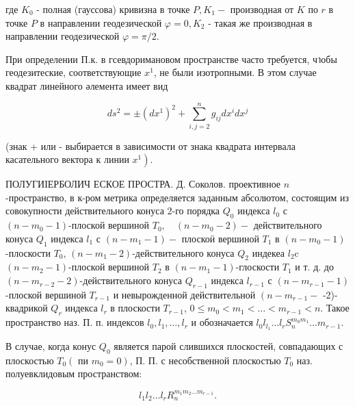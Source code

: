 \documentclass[10pt]{article}
\begin{document}
где $K_{0}$ - полная (гауссова) кривизна в точке $P, K_{1}-$ производная от $K$ по $r$ в точке $P$ в направлении геодезической $\varphi=0, K_{2}$ - такая же производная в направлении геодезической $\varphi=\pi / 2$.



При определении П.к. в гсевдоримановом пространстве часто требуется, чาобы геодезитеские, соответствующие $x^{1}$, не были изотропными. В этом случае квадрат линейного әлемента имеет вид



\[

d s^{2}= \pm\left(d x^{1}\right)^{2}+\sum_{i, j=2}^{n} g_{i j} d x^{i} d x^{j}

\]



(знак + или - выбирается в зависимости от знака квадрата интервала касательного вектора к линии $\left.x^{1}\right)$.



ПОЛУГИІЕРБОЛИЧ ЕСКОЕ ПРОСТРА. Д. Соколов. проективное $n$-пространство, в к-ром метрика определяется заданным абсолютом, состоящим из совокупности действительного конуса 2-го порядка $Q_{0}$ индекса $l_{0}$ с $\left(n-m_{0}-1\right)$-плоской вершиной $T_{0}, \quad\left(n-m_{0}-2\right)-$ действительного конуса $Q_{1}$ индекса $l_{1}$ с $\left(n-m_{1}-1\right)-$ плоскоӥ вершиной $T_{1}$ в $\left(n-m_{0}-1\right)$-плоскости $T_{0}$, $\left(n-m_{1}-2\right)$-действительного конуса $Q_{2}$ индекеа $l_{2} \mathrm{c}$ $\left(n-m_{2}-1\right)$-плоской вершиной $T_{2}$ в $\left(n-m_{1}-1\right)$-глоскости $T_{1}$ и т. д. до $\left(n-m_{r-2}-2\right)$-действительного конуса $Q_{r-1}$ индекса $l_{r-1}$ с $\left(n-m_{r-1}-1\right)$-плоской вершиной $T_{r-1}$ и невырожденной действительной $\left(n-m_{r-1}-\right.$ -2)-квадрикой $Q_{r}$ индекса $l_{r}$ в плоскости $T_{r-1}$, $0 \leqslant m_{0}<m_{1}<\ldots<m_{r-1}<n$. Такое пространство наз. П. п. индексов $l_{0}, l_{1}, \ldots, l_{r}$ и обозначается $l_{0} l_{l_{1}} \ldots l_{r} S_{n}^{m_{0} m_{1}} \ldots m_{r-1}$.



В случае, когда конус $Q_{0}$ является парой слившихся плоскостей, совпадающих с плоскостью $T_{0}\left(\right.$ пи $\left.m_{0}=0\right)$, П. П. с несобственной плоскостью $T_{0}$ наз. полуевклидовым пространством:



\[

l_{1} l_{2} \ldots l_{r} R_{n}^{m_{1} m_{2} \ldots m_{r-1}} .

\]
\end{document}
